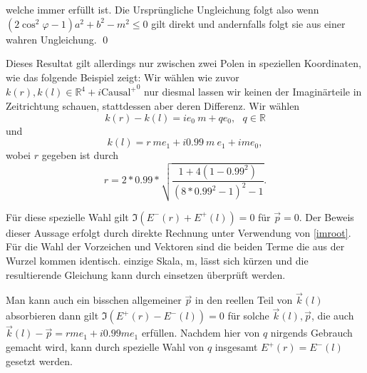 \documentclass[a4paper,12pt]{article}
\begin{document}
welche immer erfüllt ist. Die Ursprüngliche Ungleichung folgt also wenn \( (2\cos^2\varphi - 1)a^2 + b^2 - m^2 \le 0\)
gilt direkt und andernfalls folgt sie aus einer wahren Ungleichung. \qed

\vspace{2cm}
Dieses Resultat gilt allerdings nur zwischen zwei Polen in speziellen Koordinaten, wie das folgende 
Beispiel zeigt: Wir wählen wie zuvor \(k(r),k(l) \in \mathbb{R}^4+i {\text{Causal}^+}^0\) nur diesmal lassen wir keinen
der Imaginärteile in Zeitrichtung schauen, stattdessen aber deren Differenz. Wir wählen 
\begin{equation}
k(r)-k(l)=i e_0 ~m + q e_0, ~~~ q \in \mathbb{R}
\end{equation}
und
\begin{equation}
k(l)=r~m e_1 + i 0.99 ~m~ e_1 + i m e_0,
\end{equation}
wobei \(r\) gegeben ist durch
\begin{equation}
r=2*0.99*\sqrt{\frac{1+4(1-0.99^2)}{(8*0.99^2-1)^2-1}}.
\end{equation}

Für diese spezielle Wahl gilt \(\Im (E^-(r) + E^+(l))=0\) für \(\vec{p}=0\). Der Beweis dieser Aussage erfolgt durch direkte Rechnung unter Verwendung von \eqref{imroot}. Für die Wahl der Vorzeichen und Vektoren sind die beiden Terme die aus der Wurzel kommen identisch. 
einzige Skala, m, lässt sich kürzen und die resultierende Gleichung kann durch einsetzen überprüft werden.

Man kann auch ein bisschen allgemeiner \(\vec{p}\) in den reellen Teil von \(\vec{k}(l)\) absorbieren dann gilt \(\Im (E^+(r) - E^-(l))=0\) für solche \(\vec{k}(l),\vec{p}\), die auch \(\vec{k}(l)-\vec{p}= r m e_1 + i 0.99 m e_1\) erfüllen.  Nachdem hier von \(q\) nirgends Gebrauch gemacht wird, kann durch spezielle Wahl von \(q\) insgesamt \(E^+(r)=E^-(l)\) gesetzt werden. 
\end{document}
